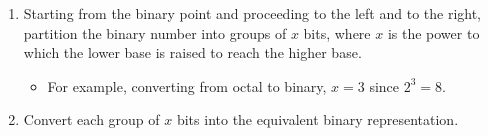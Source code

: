 \documentclass[12pt]{article}
\begin{document}
\begin{enumerate}
  \itemsep0em
  \item Starting from the binary point and proceeding to the left and to the right, partition
    the binary number into groups of $x$ bits, where $x$ is the power to which the lower base
    is raised to reach the higher base.
    \begin{itemize}
      \itemsep0em
      \item For example, converting from octal to binary, $x = 3$ since $2^3 = 8$.
    \end{itemize}
  \item Convert each group of $x$ bits into the equivalent binary representation.
\end{enumerate}
\end{document}
